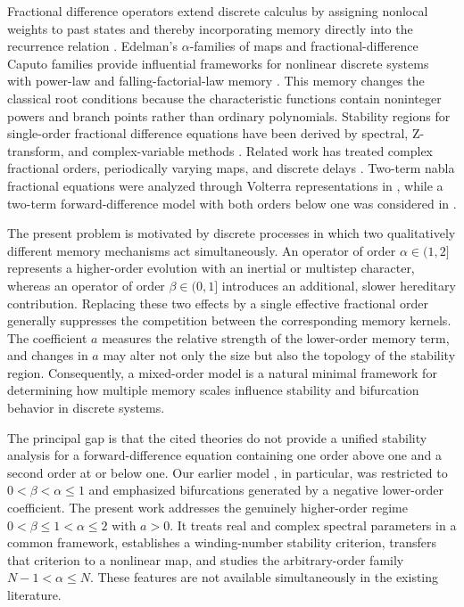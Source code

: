 \documentclass[11pt,a4paper]{article}
\theoremstyle{definition}
\begin{document}
\par Fractional difference operators extend discrete calculus by assigning nonlocal weights to past states and thereby incorporating memory directly into the recurrence relation \cite{miller1993introduction,atici2009discrete,mozyrska2015z,ferreira2022discrete}. Edelman's $\alpha$-families of maps and fractional-difference Caputo families provide influential frameworks for nonlinear discrete systems with power-law and falling-factorial-law memory \cite{edelman2013fractional,edelman2015fractional}. This memory changes the classical root conditions because the characteristic functions contain noninteger powers and branch points rather than ordinary polynomials. Stability regions for single-order fractional difference equations have been derived by spectral, Z-transform, and complex-variable methods \cite{stanislawski2013stability,abu2013asymptotic,vcermak2015explicit,wei2024explicit}. Related work has treated complex fractional orders, periodically varying maps, and discrete delays \cite{bhalekar2022stability,bhalekar2023fractional,joshi2024stability}. Two-term nabla fractional equations were analyzed through Volterra representations in \cite{cermak2012stability}, while a two-term forward-difference model with both orders below one was considered in \cite{chevala2025stability}.

\par The present problem is motivated by discrete processes in which two qualitatively different memory mechanisms act simultaneously. An operator of order $\alpha \in (1,2]$ represents a higher-order evolution with an inertial or multistep character, whereas an operator of order $\beta \in (0,1]$ introduces an additional, slower hereditary contribution. Replacing these two effects by a single effective fractional order generally suppresses the competition between the corresponding memory kernels. The coefficient $a$ measures the relative strength of the lower-order memory term, and changes in $a$ may alter not only the size but also the topology of the stability region. Consequently, a mixed-order model is a natural minimal framework for determining how multiple memory scales influence stability and bifurcation behavior in discrete systems.

\par The principal gap is that the cited theories do not provide a unified stability analysis for a forward-difference equation containing one order above one and a second order at or below one. Our earlier model \cite{chevala2025stability}, in particular, was restricted to $0 < \beta < \alpha \leq 1$ and emphasized bifurcations generated by a negative lower-order coefficient. The present work addresses the genuinely higher-order regime $0 < \beta \leq 1 < \alpha \leq 2$ with $a > 0$. It treats real and complex spectral parameters in a common framework, establishes a winding-number stability criterion, transfers that criterion to a nonlinear map, and studies the arbitrary-order family $N - 1 < \alpha \leq N$. These features are not available simultaneously in the existing literature.
\end{document}
